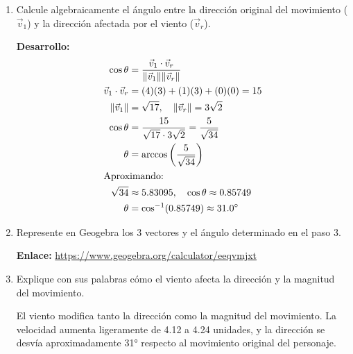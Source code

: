 \begin{enumerate}[label=\textbf{\arabic*.}, itemsep=0.8em, leftmargin=2em]
    \item Calcule algebraicamente el ángulo entre la dirección original del movimiento ($\vec v_1$) y la dirección afectada por el viento ($\vec v_r$).
    \begin{center}
    \colorbox{red!5}{\begin{minipage}{0.9\textwidth}
    \vspace{0.2cm}
    \textbf{Desarrollo:}
    \vspace{0.2cm}
    \begin{align*}
    \cos \theta &= \frac{\vec v_1 \cdot \vec v_r}{\|\vec v_1\| \|\vec v_r\|} \\
    \vec v_1 \cdot \vec v_r &= (4)(3) + (1)(3) + (0)(0) = 15 \\
    \|\vec v_1\| &= \sqrt{17}, \quad \|\vec v_r\| = 3\sqrt{2} \\
    \cos \theta &= \frac{15}{\sqrt{17} \cdot 3\sqrt{2}} = \frac{5}{\sqrt{34}} \\
    \theta &= \arccos\left(\frac{5}{\sqrt{34}}\right) \\
    \intertext{Aproximando:}
    \sqrt{34} &\approx 5.83095, \quad \cos\theta \approx 0.85749 \\
    \theta &= \cos^{-1}(0.85749) \approx 31.0^\circ
    \end{align*}
    \vspace{0.2cm}
    \end{minipage}}
    \end{center}
    
  \item Represente en Geogebra los 3 vectores y el ángulo determinado en el paso 3.
  \begin{center}
  \colorbox{gray!5}{\parbox{0.95\textwidth}{\vspace{0.2cm}\centering
  \textbf{Enlace:} \url{https://www.geogebra.org/calculator/eeqvmjxt}\vspace{0.2cm}}}
  \end{center}
  
  \item Explique con sus palabras cómo el viento afecta la dirección y la magnitud del movimiento.
  
  \begin{center}
  \colorbox{yellow!5}{\begin{minipage}{0.9\textwidth}
  \vspace{0.3cm}
  El viento modifica tanto la dirección como la magnitud del movimiento. La velocidad aumenta ligeramente de 4.12 a 4.24 unidades, y la dirección se desvía aproximadamente 31° respecto al movimiento original del personaje.
  \vspace{0.3cm}
  \end{minipage}}
  \end{center}
\end{enumerate}
